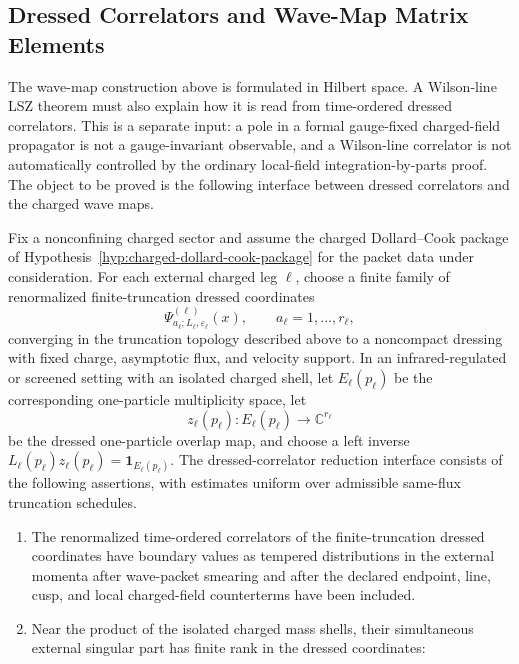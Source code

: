 \subsection{Dressed Correlators and Wave-Map Matrix Elements}

The wave-map construction above is formulated in Hilbert space.  A
Wilson-line LSZ theorem must also explain how it is read from
time-ordered dressed correlators.  This is a separate input: a pole in a
formal gauge-fixed charged-field propagator is not a gauge-invariant
observable, and a Wilson-line correlator is not automatically controlled by
the ordinary local-field integration-by-parts proof.  The object to be
proved is the following interface between dressed correlators and the
charged wave maps.

\begin{hypothesis}
\label{hyp:dressed-correlator-wave-map-interface}
Fix a nonconfining charged sector and assume the charged
Dollard--Cook package of Hypothesis~\ref{hyp:charged-dollard-cook-package}
for the packet data under consideration.  For each external charged leg
\(\ell\), choose a finite family of renormalized finite-truncation dressed
coordinates
\[
  \Psi^{(\ell)}_{a_\ell;L_\ell,\varepsilon_\ell}(x),
  \qquad a_\ell=1,\ldots,r_\ell,
\]
converging in the truncation topology described above to a noncompact
dressing with fixed charge, asymptotic flux, and velocity support.  In an
infrared-regulated or screened setting with an isolated charged shell, let
\(E_\ell(p_\ell)\) be the corresponding one-particle multiplicity space,
let
\[
  z_\ell(p_\ell):E_\ell(p_\ell)\longrightarrow\mathbb C^{r_\ell}
\]
be the dressed one-particle overlap map, and choose a left inverse
\(L_\ell(p_\ell)z_\ell(p_\ell)=\mathbf 1_{E_\ell(p_\ell)}\).  The
dressed-correlator reduction interface consists of the following assertions,
with estimates uniform over admissible same-flux truncation schedules.
\begin{enumerate}
\item The renormalized time-ordered correlators of the finite-truncation
dressed coordinates have boundary values as tempered distributions in the
external momenta after wave-packet smearing and after the declared endpoint,
line, cusp, and local charged-field counterterms have been included.
\item Near the product of the isolated charged mass shells, their simultaneous
external singular part has finite rank in the dressed coordinates:
\begin{equation}

\end{equation}
\end{enumerate}
\end{hypothesis}
